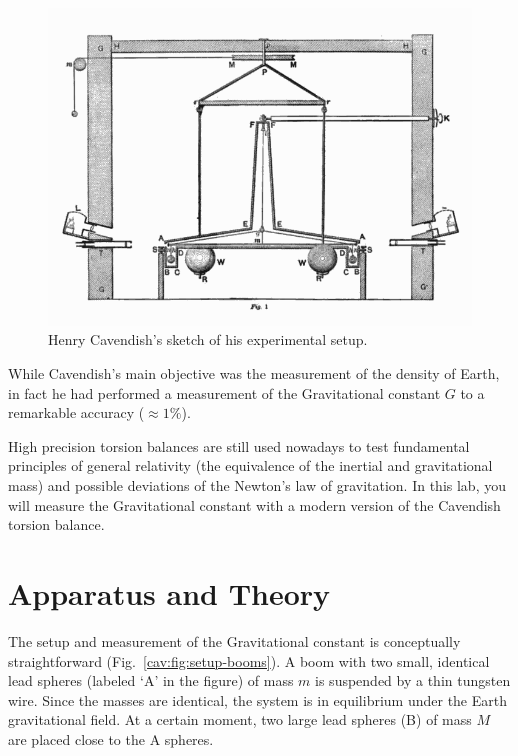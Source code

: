 \begin{figure}
	\centering
	\includegraphics[width=\textwidth]{cavendish/Cavendish_Experiment}
	\caption{Henry Cavendish's sketch of his experimental setup.}\label{cav:fig:original-setup}
\end{figure}

While Cavendish's main objective was the measurement of the density of Earth, in fact
he had performed a measurement of the Gravitational constant $G$ to a remarkable
accuracy ($\approx 1\%$).

High precision torsion balances are still used nowadays to test fundamental principles of
general relativity (the equivalence of the inertial and gravitational mass) and possible
deviations of the Newton’s law of gravitation. In this lab, you will measure the
Gravitational constant with a modern version of the Cavendish torsion balance.

\section{Apparatus and Theory}\label{cav:sec:apparatus}

The setup and measurement of the Gravitational constant is conceptually straightforward (Fig.~\ref{cav:fig:setup-booms}). A boom
with two small, identical lead spheres (labeled `A' in the figure) of mass $m$ is suspended by a thin tungsten
wire. Since the masses are identical, the system is in equilibrium under the Earth
gravitational field. At a certain moment, two large lead spheres (B) of mass $M$ are placed
close to the A spheres.

